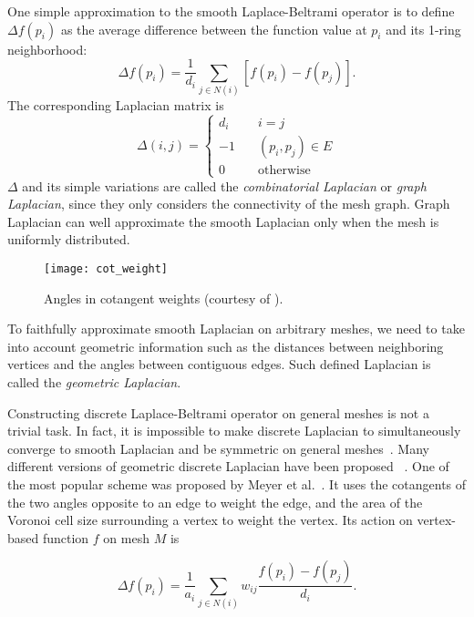 One simple approximation to the smooth Laplace-Beltrami operator is to
define $\Delta f(p_i)$ as the average difference between the function
value at $p_i$ and its 1-ring neighborhood:
\begin{equation}
\Delta f(p_i)=\frac{1}{d_i}\sum_{j\in N(i)} [f(p_i)-f(p_j)].
\end{equation}
The corresponding Laplacian matrix is
\begin{equation}
\Delta(i,j)=\left\{
    \begin{array}{lc}
    d_i\quad & i=j \\
    -1\quad & (p_i,p_j)\in E \\
    0\quad & \text{otherwise}
    \end{array}
\right.
\end{equation}
$\Delta$ and its simple variations are called the \emph{combinatorial Laplacian}
or \emph{graph Laplacian}, since they only considers the connectivity of the mesh
graph. Graph Laplacian can well approximate the smooth Laplacian only when the mesh
is uniformly distributed.

\begin{figure}
  \centering
  \texttt{[image: cot\_weight]}
  \caption[Angles in cotangent weights]{Angles in cotangent weights (courtesy of \cite{Sorkine:EG:2005}).}
\label{fig:cotweights}
\end{figure}

To faithfully approximate smooth Laplacian on arbitrary meshes, we need to take
into account geometric information such as the distances between neighboring
vertices and the angles between contiguous edges. Such defined Laplacian is
called the \emph{geometric Laplacian}.

Constructing discrete Laplace-Beltrami operator on general meshes is not a trivial task.
In fact, it is impossible to make discrete Laplacian to simultaneously converge to smooth
Laplacian and be symmetric on general meshes~\cite{Rustamov:2007:LEF}. Many different
versions of geometric discrete Laplacian have been proposed
~\cite{pinkall1993computing, Desbrun1999, Xu:2004:GMP, Levy2006, Vallet2008, Belkin:2008:SCG}.
One of the most popular scheme was proposed by Meyer et al.~\cite{Meyer2003}.
It uses the cotangents of the two angles opposite to an edge to weight the edge,
and the area of the Voronoi cell size surrounding a vertex to weight the vertex.
Its action on vertex-based function $f$ on mesh $M$ is

\begin{equation}
\Delta f(p_i)=\frac{1}{a_i}\sum_{j\in N(i)}w_{ij}\frac{f(p_i)-f(p_j)}{d_i}.
\end{equation}

